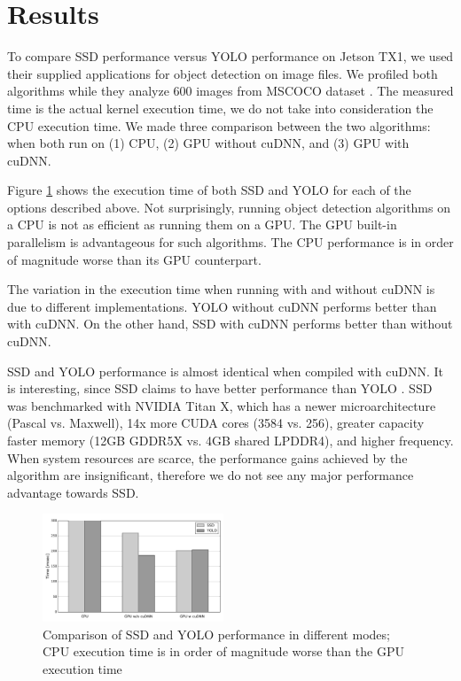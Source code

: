 \section{Results} 
\label{sec:results}

To compare SSD performance versus YOLO performance on Jetson TX1, we used their supplied applications for object detection on image files. We profiled both algorithms while they analyze 600 images from MSCOCO dataset \cite{mscoco}. The measured time is the actual kernel execution time, we do not take into consideration the CPU execution time. We made three comparison between the two algorithms: when both run on (1) CPU, (2) GPU without cuDNN, and (3) GPU with cuDNN\footnotemark.


Figure \ref{fig:t_exec} shows the execution time of both SSD and YOLO for each of the options described above.
Not surprisingly, running object detection algorithms on a CPU is not as efficient as running them on a GPU. The GPU built-in parallelism is advantageous for such algorithms. The CPU performance is in order of magnitude worse than its GPU counterpart. 

The variation in the execution time when running with and without cuDNN is due to different implementations. YOLO without cuDNN performs better than with cuDNN. On the other hand, SSD with cuDNN performs better than without cuDNN.

SSD and YOLO performance is almost identical when compiled with cuDNN. It is interesting, since SSD claims to have better performance than YOLO \cite{liu2016ssd}. SSD was benchmarked with NVIDIA Titan X, which has a newer microarchitecture (Pascal vs. Maxwell), 14x more CUDA cores (3584 vs. 256), greater capacity faster memory (12GB GDDR5X vs. 4GB shared LPDDR4), and higher frequency. When system resources are scarce, the performance gains achieved by the algorithm are insignificant, therefore we do not see any major performance advantage towards SSD.

\begin{figure}[h]
	\includegraphics[width=0.48\textwidth]{./imgs/t_exec.pdf}
	\caption{Comparison of SSD and YOLO performance in different modes; CPU execution time is in order of magnitude worse than the GPU execution time}
	\label{fig:t_exec}
\end{figure}

